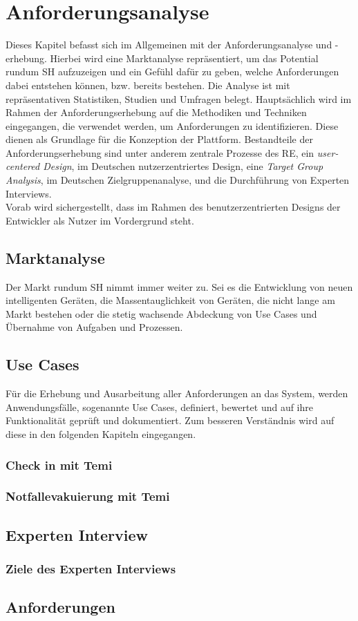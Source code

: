 \chapter{Anforderungsanalyse}
\label{chap:anforderungsanalyse}
    Dieses Kapitel befasst sich im Allgemeinen mit der Anforderungsanalyse und -erhebung. Hierbei wird eine
    Marktanalyse repräsentiert, um das Potential rundum \acl{SH} aufzuzeigen und ein Gefühl 
    dafür zu geben, welche Anforderungen dabei entstehen können, bzw. bereits bestehen. Die Analyse ist 
    mit repräsentativen Statistiken, Studien und Umfragen belegt. Hauptsächlich wird im Rahmen der Anforderungserhebung 
    auf die Methodiken und Techniken eingegangen, die verwendet werden, um 
    Anforderungen zu identifizieren. Diese dienen als Grundlage für die Konzeption der Plattform. Bestandteile der 
    Anforderungserhebung sind unter anderem zentrale Prozesse des \acl{RE}, ein \textit{user-centered Design}, im Deutschen nutzerzentriertes Design, eine 
    \textit{Target Group Analysis}, im Deutschen Zielgruppenanalyse, und die Durchführung von Experten Interviews.
    \\
    Vorab wird sichergestellt, dass im Rahmen des benutzerzentrierten Designs der Entwickler als Nutzer im Vordergrund steht.
\section{Marktanalyse}
\label{sec:marktanalyse}
    Der Markt rundum \acl{SH} nimmt immer weiter zu. Sei es die Entwicklung von neuen intelligenten Geräten, die 
    Massentauglichkeit von Geräten, die nicht lange am Markt bestehen oder die stetig wachsende Abdeckung von 
    Use Cases und Übernahme von Aufgaben und Prozessen. 
\section{Use Cases}
    Für die Erhebung und Ausarbeitung aller Anforderungen an das System, werden Anwendungsfälle, sogenannte Use Cases, 
    definiert, bewertet und auf ihre Funktionalität geprüft und dokumentiert. Zum besseren Verständnis wird auf diese in den 
    folgenden Kapiteln eingegangen. 
\subsection{Check in mit Temi}
\subsection{Notfallevakuierung mit Temi}
\section{Experten Interview}
\subsection{Ziele des Experten Interviews}
\section{Anforderungen}
